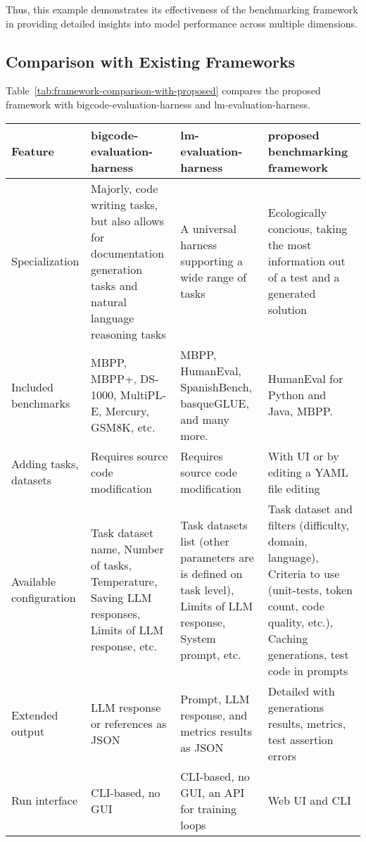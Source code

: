 Thus, this example demonstrates its effectiveness of the benchmarking framework in providing detailed insights into model performance across multiple dimensions.

\subsection{Comparison with Existing Frameworks}

Table~\ref{tab:framework-comparison-with-proposed} compares the proposed framework with bigcode-evaluation-harness and lm-evaluation-harness.

\begin{table}[H]
    \centering
    \begin{tabular}{|p{2.3cm}|p{4.3cm}|p{4.3cm}|p{4.3cm}|}
        \hline
        \textbf{Feature} & \textbf{bigcode-evaluation-harness} & \textbf{lm-evaluation-harness} & \textbf{proposed benchmarking framework} \\
        \hline
        Specialization & Majorly, code writing tasks, but also allows for documentation generation tasks and natural language reasoning tasks & A universal harness supporting a wide range of tasks & Ecologically concious, taking the most information out of a test and a generated solution \\
        \hline
        Included benchmarks & MBPP, MBPP+, DS-1000, MultiPL-E, Mercury, GSM8K, etc. & MBPP, HumanEval, SpanishBench, basqueGLUE, and many more. & HumanEval for Python and Java, MBPP. \\
        \hline
        Adding tasks, datasets & Requires source code modification & Requires source code modification & With UI or by editing a YAML file editing \\
        \hline
        Available configuration & Task dataset name, Number of tasks, Temperature, Saving LLM responses, Limits of LLM response, etc. & Task datasets list (other parameters are is defined on task level), Limits of LLM response, System prompt, etc. & Task dataset and filters (difficulty, domain, language), Criteria to use (unit-tests, token count, code quality, etc.), Caching generations, test code in prompts \\
        \hline
        Extended output & LLM response or references as JSON & Prompt, LLM response, and metrics results as JSON & Detailed with generations results, metrics, test assertion errors  \\
        \hline
        Run interface & CLI-based, no GUI & CLI-based, no GUI, an API for training loops & Web UI and CLI \\

\end{tabular}
\end{table}
